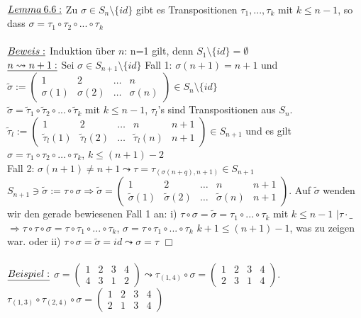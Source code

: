 \documentclass[fleqn, a4paper, 11pt]{article}
\begin{document}
\\
$\uline{Lemma\:6.6:}$ Zu $\sigma\in S_n\setminus\{id\}$ gibt es Transpositionen $\tau_1,...,\tau_k$ mit $k\leq n-1$, so dass $\sigma=\tau_1\circ\tau_2\circ ...\circ\tau_k$\\
\\
$\uline{Beweis:}$ Induktion \"uber $n$: n=1 gilt, denn $S_1\setminus\{id\}=\emptyset$\\
$\uline{n\leadsto n+1:}$ Sei $\sigma\in S_{n+1}\setminus\{id\}$ Fall 1: $\sigma(n+1)=n+1$ und $\tilde{\sigma}:=\begin{pmatrix}
	1 & 2 & \dots & n\\
	\sigma(1) & \sigma(2) & \dots & \sigma(n)
\end{pmatrix}\in S_n\setminus\{id\}$\\
$\tilde{\sigma}=\tilde{\tau}_1\circ\tilde{\tau}_2\circ...\circ\tilde{\tau}_k$ mit $k\leq n-1$, $\tau_l$'s sind Transpositionen aus $S_n$. $\tilde{\tau}_l:=\begin{pmatrix}
	1 & 2 & \dots & n & n+1\\
	\tilde{\tau}_l (1) & \tilde{\tau}_l (2) & \dots & \tilde{\tau}_l (n) & n+1
\end{pmatrix}\in S_{n+1}$ und es gilt $\sigma=\tau_1\circ\tau_2\circ\dots\circ\tau_k$, $k\leq(n+1)-2$\\
Fall 2: $\sigma(n+1)\neq n+1\leadsto\tau=\tau_{(\sigma(n+q),n+1)}\in S_{n+1}$\\
$S_{n+1}\ni\tilde{\sigma}:=\tau\circ\sigma\Rightarrow\tilde{\sigma}=\begin{pmatrix}
	1 & 2 & \dots & n & n+1\\
	\tilde{\sigma}(1) & \tilde{\sigma}(2) & \dots & \tilde{\sigma}(n) & n+1
\end{pmatrix}$. Auf $\tilde{\sigma}$ wenden wir den gerade bewiesenen Fall 1 an: i) $\tau\circ\sigma=\tilde{\sigma}=\tau_1\circ...\circ\tau_k$ mit $k\leq n-1$ $|\tau\cdot \_$ $\Rightarrow \tau\circ\tau\circ\sigma=\tau\circ\tau_1\circ...\circ\tau_k$, $\sigma=\tau\circ\tau_1\circ...\circ\tau_k$ $k+1\leq (n+1)-1$, was zu zeigen war.
oder ii) $\tau\circ\sigma=\tilde{\sigma}=id\leadsto \sigma=\tau$ \hfill $\Box$\\
\\
$\uline{Beispiel:}$ $\sigma=\begin{pmatrix}
	1 & 2 & 3 & 4\\
	4 & 3 & 1 & 2
\end{pmatrix}\leadsto\tau_{(1,4)}\circ\sigma=\begin{pmatrix}
	1 & 2 & 3 & 4\\
	2 & 3 & 1 & 4
\end{pmatrix}$. $\tau_{(1,3)}\circ\tau_{(2,4)}\circ\sigma=\begin{pmatrix}
	1 & 2 & 3 & 4\\
	2 & 1 & 3 & 4
\end{pmatrix}$\\
\end{document}

